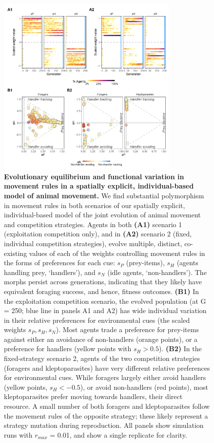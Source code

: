 \begin{figure}[h!]
    \centering
    \includegraphics[width=0.8\textwidth]{figures/patternprocess/fig_01.png}
    \caption{
        \textbf{Evolutionary equilibrium and functional variation in movement rules in a spatially explicit, individual-based model of animal movement.}
        We find substantial polymorphism in movement rules in both scenarios of our spatially explicit, individual-based model of the joint evolution of animal movement and competition strategies.
        Agents in both \textbf{(A1)} scenario 1 (exploitation competition only), and in \textbf{(A2)} scenario 2 (fixed, individual competition strategies), evolve multiple, distinct, co-existing values of each of the weights controlling movement rules in the forms of preferences for each cue: $s_P$ (prey-items), $s_H$ (agents handling prey, `handlers'), and $s_N$ (idle agents, `non-handlers').
        The morphs persist across generations, indicating that they likely have equivalent foraging success, and hence, fitness outcomes.
        \textbf{(B1)} In the exploitation competition scenario, the evolved population (at G = 250; blue line in panels A1 and A2) has wide individual variation in their relative preferences for environmental cues (the scaled weights $s_P, s_H, s_N$).
        Most agents trade a preference for prey-items against either an avoidance of non-handlers (orange points), or a preference for handlers (yellow points with $s_H > 0.5$).
        \textbf{(B2)} In the fixed-strategy scenario 2, agents of the two competition strategies (foragers and kleptoparasites) have very different relative preferences for environmental cues.
        While foragers largely either avoid handlers (yellow points, $s_H < -0.5$), or avoid non-handlers (red points), most kleptoparasites prefer moving towards handlers, their direct resource.
        A small number of both foragers and kleptoparasites follow the movement rules of the opposite strategy; these likely represent a strategy mutation during reproduction.
        All panels show simulation runs with $r_{max}$ = 0.01, and show a single replicate for clarity.
    }
    \label{fig1}
\end{figure}

